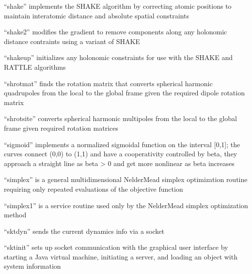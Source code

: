 \documentclass[letterpaper,11pt,english]{sphinxmanual}
\begin{document}



“shake” implements the SHAKE algorithm by correcting atomic
positions to maintain interatomic distance and absolute spatial
constraints


“shake2” modifies the gradient to remove components along any
holonomic distance contraints using a variant of SHAKE


“shakeup” initializes any holonomic constraints for use with
the SHAKE and RATTLE algorithms


“shrotmat” finds the rotation matrix that converts spherical
harmonic quadrupoles from the local to the global frame given
the required dipole rotation matrix


“shrotsite” converts spherical harmonic multipoles from the
local to the global frame given required rotation matrices


“sigmoid” implements a normalized sigmoidal function on the
interval {[}0,1{]}; the curves connect (0,0) to (1,1) and have
a cooperativity controlled by beta, they approach a straight
line as beta \sphinxhyphen{}\textgreater{} 0 and get more nonlinear as beta increases


“simplex” is a general multidimensional Nelder\sphinxhyphen{}Mead simplex
optimization routine requiring only repeated evaluations of
the objective function


“simplex1” is a service routine used only by the Nelder\sphinxhyphen{}Mead
simplex optimization method


“sktdyn” sends the current dynamics info via a socket


“sktinit” sets up socket communication with the graphical
user interface by starting a Java virtual machine, initiating
a server, and loading an object with system information
\end{document}
